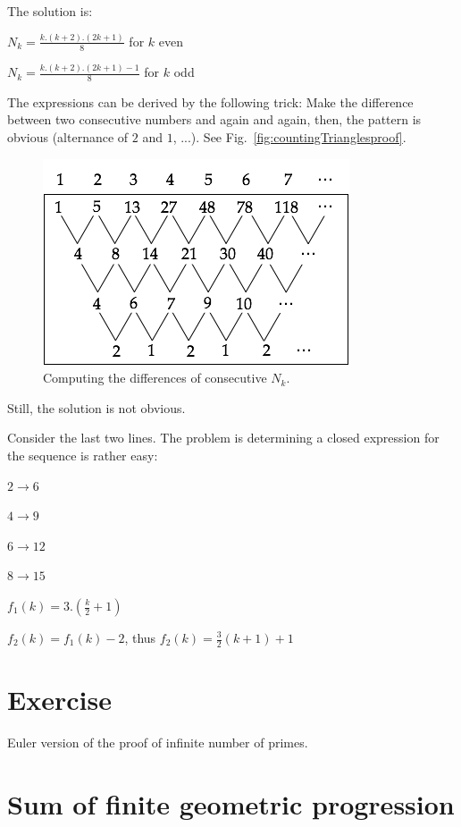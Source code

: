 \documentclass{article}[12pt]
\begin{document}
The solution is:

$N_k = \frac{k.(k+2).(2k+1)}{8}$ for $k$ even

$N_k = \frac{k.(k+2).(2k+1)-1}{8}$ for $k$ odd
\bigskip

The expressions can be derived by the following trick:
Make the difference between two consecutive numbers and again and again, then, the pattern is obvious
(alternance of $2$ and $1$, ...). See Fig.~\ref{fig:countingTrianglesproof}.
\begin{figure}[h]
\begin{center}
        \includegraphics[scale=0.5]{FiguresArithmetic/CountingTrianglesProof} 
        \caption{Computing the differences of consecutive $N_k$.}
        \label{fig:countingTrianglesProof}
\end{center}
\end{figure}
\bigskip

Still, the solution is not obvious.

Consider the last two lines.
The problem is determining a closed expression for the sequence is rather easy:

$2 \rightarrow 6$

$4 \rightarrow 9$

$6 \rightarrow 12$

$8 \rightarrow 15$

$f_1(k) = 3.(\frac{k}{2}+1)$

$f_2(k) = f_1(k) - 2$, thus $f_2(k) = \frac{3}{2}(k+1)+1$


\section{Exercise}


Euler version of the proof of infinite number of primes.



\section{Sum of finite geometric progression}
\end{document}
